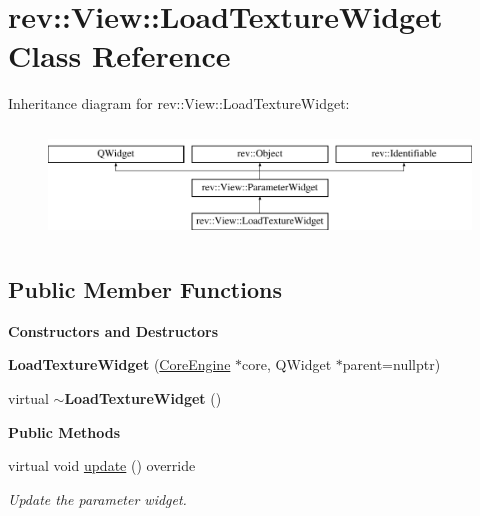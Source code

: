 \hypertarget{classrev_1_1_view_1_1_load_texture_widget}{}\section{rev\+::View\+::Load\+Texture\+Widget Class Reference}
\label{classrev_1_1_view_1_1_load_texture_widget}
Inheritance diagram for rev\+::View\+::Load\+Texture\+Widget\+:\begin{figure}[H]
\begin{center}
\leavevmode
\includegraphics[height=2.994653cm]{classrev_1_1_view_1_1_load_texture_widget}
\end{center}
\end{figure}
\subsection*{Public Member Functions}
\begin{Indent}\textbf{ Constructors and Destructors}\par
\begin{DoxyCompactItemize}
\item 
\mbox{\label{classrev_1_1_view_1_1_load_texture_widget_a95eca331e21478133c9890aa9d9a9793}} 
{\bfseries Load\+Texture\+Widget} (\mbox{\hyperlink{classrev_1_1_core_engine}{Core\+Engine}} $\ast$core, Q\+Widget $\ast$parent=nullptr)
\item 
\mbox{\label{classrev_1_1_view_1_1_load_texture_widget_a942028abe5ddf5038e498f50ec88080e}} 
virtual {\bfseries $\sim$\+Load\+Texture\+Widget} ()
\end{DoxyCompactItemize}
\end{Indent}
\begin{Indent}\textbf{ Public Methods}\par
\begin{DoxyCompactItemize}
\item 
\mbox{\label{classrev_1_1_view_1_1_load_texture_widget_a6d1da8b496d39f797e908796a0a7f885}} 
virtual void \mbox{\hyperlink{classrev_1_1_view_1_1_load_texture_widget_a6d1da8b496d39f797e908796a0a7f885}{update}} () override
\begin{DoxyCompactList}\small\item\em Update the parameter widget. \end{DoxyCompactList}\end{DoxyCompactItemize}
\end{Indent}
